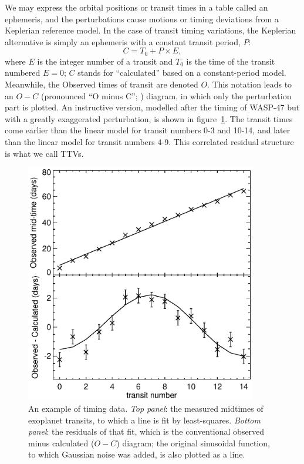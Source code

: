 \documentclass[graybox,natbib,nosecnum]{svmult}
\begin{document}
We may express the orbital positions or transit times in a table called an ephemeris, and the perturbations cause motions or timing deviations from a Keplerian reference model.  In the case of transit timing variations, the Keplerian alternative is simply an ephemeris with a constant transit period, $P$:
\begin{equation}
C = T_0 + P \times E, 
\end{equation}
where $E$ is the integer number of a transit and $T_0$ is the time of the transit numbered $E=0$; $C$ stands for ``calculated'' based on a constant-period model.  Meanwhile, the Observed times of transit are denoted $O$.  This notation leads to an $O-C$ (pronounced ``O minus C''; \citealt{2005Sterken}) diagram, in which only the perturbation part is plotted.  An instructive version, modelled after the timing of WASP-47 \citep{2015Becker} but with a greatly exaggerated perturbation, is shown in figure~\ref{omc}.  The transit times come earlier than the linear model for transit numbers 0-3 and 10-14, and later than the linear model for transit numbers 4-9.  This correlated residual structure is what we call TTVs.

\begin{figure}
\centerline{
\includegraphics[width=0.9\textwidth]{omc.eps}}
%
\caption{An example of timing data.  \emph{Top panel}: the measured midtimes of exoplanet transits, to which a line is fit by least-squares.  \emph{Bottom panel}: the residuals of that fit, which is the conventional observed minus calculated ($O-C$) diagram; the original sinusoidal function, to which Gaussian noise was added, is also plotted as a line. }
\label{omc}       %
\end{figure}
\end{document}
